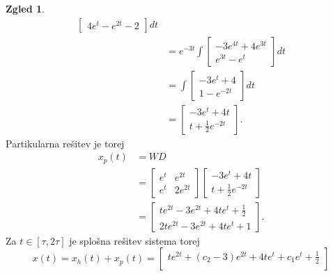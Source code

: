 \documentclass[12pt,a4paper]{amsart}
\theoremstyle{definition} %
\newtheorem{zgled}[definicija]{Zgled}
\theoremstyle{plain} %
\begin{document}
\begin{zgled}
\begin{equation*}
\begin{split}
\begin{bmatrix}
                        4e^{t}-e^{2t}-2  
                    \end{bmatrix} dt \\
                    &= e^{-3t}\int \begin{bmatrix}
                        -3e^{4t}+4e^{3t}  \\
                        e^{3t}-e^t  
                    \end{bmatrix} dt \\
                    &= \int \begin{bmatrix}
                        -3e^{t}+4  \\
                        1-e^{-2t}  
                    \end{bmatrix} dt \\
                    &= \begin{bmatrix}
                        -3e^t+4t  \\
                        t+\frac{1}{2}e^{-2t}  
                    \end{bmatrix}.
        \end{split}
    \end{equation*}
    Partikularna rešitev je torej 
    \begin{equation*}
        \begin{split}
            x_p(t) &= WD \\
                    &= \begin{bmatrix}
                        e^t & e^{2t} \\
                        e^t & 2e^{2t} 
                    \end{bmatrix} \begin{bmatrix}
                        -3e^t+4t  \\
                        t+\frac{1}{2}e^{-2t}  
                    \end{bmatrix} \\
                    &= \begin{bmatrix}
                        te^{2t}-3e^{2t}+4te^t+\frac{1}{2}  \\
                        2te^{2t}-3e^{2t}+4te^{t}+1 
                    \end{bmatrix}.
        \end{split}
    \end{equation*}
    Za $t\in[\tau,2\tau]$ je splošna rešitev sistema torej
    \[x(t)=x_h(t)+x_p(t)=\begin{bmatrix}
        te^{2t}+(c_2-3)e^{2t}+4te^t+c_1e^t+\frac{1}{2}  \\

\end{bmatrix}\]
\end{zgled}
\end{document}
